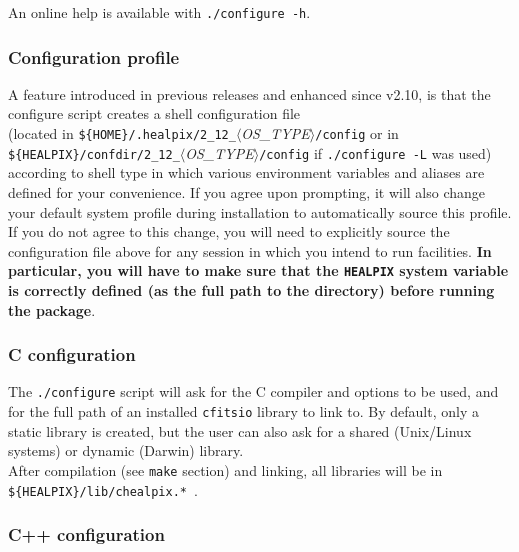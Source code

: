 \documentclass[12pt,twoside]{article}
\begin{document}
An online help is available with {\tt ./configure -h}.

\subsubsection{Configuration profile}
\label{subsub:conf}
A feature introduced in previous releases and enhanced since v2.10, is that 
the configure script creates a shell configuration file \hfill\\
(located in
{\tt \$\{HOME\}/.healpix/2\_12\_}{\em $\langle$OS\_TYPE$\rangle$}{\tt /config}
or in
\hfill\\
{\tt \$\{HEALPIX\}/confdir/2\_12\_}{\em $\langle$OS\_TYPE$\rangle$}{\tt /config}
if {\tt ./configure -L} was used)
according to shell
type in which various environment variables and aliases are defined
for your convenience. If you agree upon prompting, it will also
change your default system profile during installation to
automatically source this profile. If you do not agree to this change,
you will need to explicitly source the configuration file above for any session in
which you intend to run \healpix facilities. {\bf In particular, you will
have to make sure that the {\tt HEALPIX} system variable is correctly
defined (as the full path to the \healpix directory) before running
the package}.


\subsubsection{C configuration}

The {\tt ./configure} script will ask for the C compiler and options to
be used, and for the full path of an installed {\tt cfitsio} library to link to.
By default, only a static library is created, but the user can also ask for
 a shared (Unix/Linux systems) or dynamic (Darwin) library. \\
After compilation
(see {\tt make} section) and linking, all libraries will be 
in {\tt \$\{HEALPIX\}/lib/chealpix.*}\ .

\subsubsection{C++ configuration}
\end{document}
